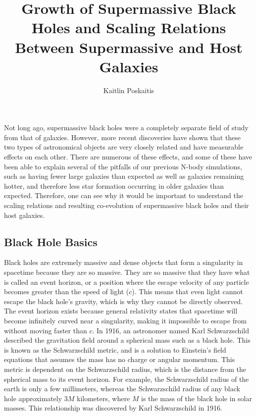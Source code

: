 \documentclass[12pt]{article}
\title{Growth of Supermassive Black Holes and Scaling Relations
              Between Supermassive and Host Galaxies}
\date{}
\author{Kaitlin Poskaitis}
\begin{document}
\clearpage
\maketitle
\thispagestyle{empty}

\tableofcontents

\pagebreak
\setcounter{page}{1}

Not long ago, supermassive black holes were a completely separate field of study
from that of galaxies.  However, more recent discoveries have shown that these
two types of astronomical objects are very closely related and have measurable
effects on each other.  There are numerous of these effects, and some of these
have been able to explain several of the pitfalls of our previous N-body
simulations, such as having fewer large galaxies than expected as well as
galaxies remaining hotter, and therefore less star formation occurring in older
galaxies than expected.  Therefore, one can see why it would be important to
understand the scaling relations and resulting co-evolution of supermassive
black holes and their host galaxies.

\subsection{Black Hole Basics}
Black holes are extremely massive and dense objects that form a singularity in
spacetime
because they are so massive.  They are so massive that they have what is called
an event horizon, or a position where the escape velocity of any particle
becomes greater than the speed of light ($c$).  This means that even light cannot
escape the black
hole's gravity, which is why they cannot be directly observed.  The event
horizon exists because general relativity states that spacetime will become
infinitely curved near a singularity, making it impossible to escape from
without moving faster than $c$.
In 1916, an astronomer named Karl Schwarzschild described the gravitation field
around a spherical mass such as a black hole.  This is known as the
Schwarzschild metric, and is a solution to Einstein's field equations that
assumes the mass has no charge or angular momentum.  This metric is dependent on
the Schwarzschild radius, which is the distance from the spherical mass to its
event horizon.  For example, the Schwarzschild radius of the earth is only a few
millimeters, whereas the Schwarzschild radius of any black hole
approximately $3M$ kilometers, where $M$ is the mass of the black hole in solar
masses.  This relationship was discovered by Karl Schwarzschild in 1916.
\end{document}
